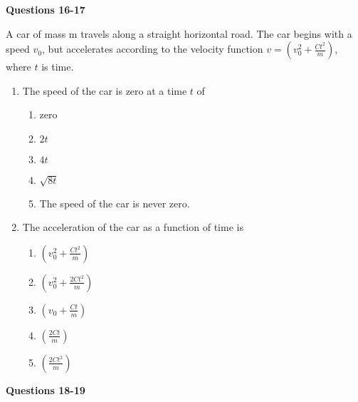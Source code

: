 \documentclass{../../oss-apphys}
\begin{document}
\begin{multicols}{2}
  \textbf{Questions 16-17}

  A car of mass m travels along a straight horizontal road. The car begins with
  a speed $v_0$, but accelerates according to the velocity function
  $\displaystyle v=\left(v_0^2+\frac{Ct^2}{m}\right)$, where $t$ is time.

  \begin{enumerate}[resume,leftmargin=18pt]
  \item The speed of the car is zero at a time $t$ of
    \begin{enumerate}[noitemsep,topsep=0pt,leftmargin=18pt,label=(\Alph*)]
    \item zero
    \item $2t$
    \item $4t$
    \item $\sqrt{8t}$
    \item The speed of the car is never zero.
    \end{enumerate}
    
  \item The acceleration of the car as a function of time is
    \begin{enumerate}[noitemsep,topsep=0pt,leftmargin=18pt,label=(\Alph*)]
    \item $\displaystyle\left(v_0^2+\frac{Ct^2}{m}\right)$
    \item $\displaystyle\left(v_0^2+\frac{2Ct^2}{m}\right)$
    \item $\displaystyle\left(v_0+\frac{Ct}{m}\right)$
    \item $\displaystyle\left(\frac{2Ct}{m}\right)$
    \item $\displaystyle\left(\frac{2Ct^2}{m}\right)$
    \end{enumerate}
  \end{enumerate}
  \columnbreak
  
  \textbf{Questions 18-19}


\end{multicols}
\end{document}
